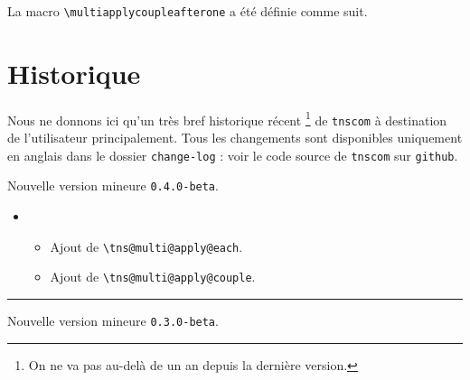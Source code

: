 \documentclass[12pt,a4paper]{article}
\makeatletter
\newcommand\env[1]{\texttt{#1}}
\newcommand\macro[1]{\env{\textbackslash{}#1}}
\theoremstyle{definition}
\newcommand\separation{
	\medskip
	\hfill\rule{0.5\textwidth}{0.75pt}\hfill
	\medskip
}
\newcommand\topic{\@ifstar{\@topic@star}{\@topic@no@star}}
\newcommand\@topic@no@star[1]{%
	\textbf{\textsc{#1}.}%
}
\newcommand\@topic@star[1]{%
	\textbf{\textsc{#1} :}%
}
\makeatother
\begin{document}
{{{{{{{{{{{\begin{latexex}
\end{latexex}

La macro \macro{multiapplycoupleafterone} a été définie comme suit.

\begin{latexex-alone}
\newcommand\decocoupleafterfirst[2]{%
    \ifnum\value{tns@multi@apply@couple@position}=1
        \{#1-#2\}%
    \else%
        (#1)[#2]%
    \fi
}

\newcommand\multiapplycoupleafterone[1]{%
    \tns@multi@apply@couple{\decocoupleafterfirst}{#1}
}
\end{latexex-alone}


\newpage

\section{Historique}

Nous ne donnons ici qu'un très bref historique récent
\footnote{
	On ne va pas au-delà de un an depuis la dernière version.
}
de \verb+tnscom+ à destination de l'utilisateur principalement.
Tous les changements sont disponibles uniquement en anglais dans le dossier \verb+change-log+ : voir le code source de \verb+tnscom+ sur \verb+github+.

\begin{description}

    \medskip
    \item[2020-08-05] Nouvelle version mineure \verb+0.4.0-beta+.
    
    \begin{itemize}[itemsep=.5em]
        \item \topic{Multi-argument}
        \begin{itemize}[itemsep=.5em]
            \item Ajout de \macro{tns@multi@apply@each}.
    
            \item Ajout de \macro{tns@multi@apply@couple}.
        \end{itemize}
    \end{itemize}
    
    \separation


    \medskip
    \item[2020-07-30] Nouvelle version mineure \verb+0.3.0-beta+.
    

\end{description}}}}}}}}}}}}
\end{document}
